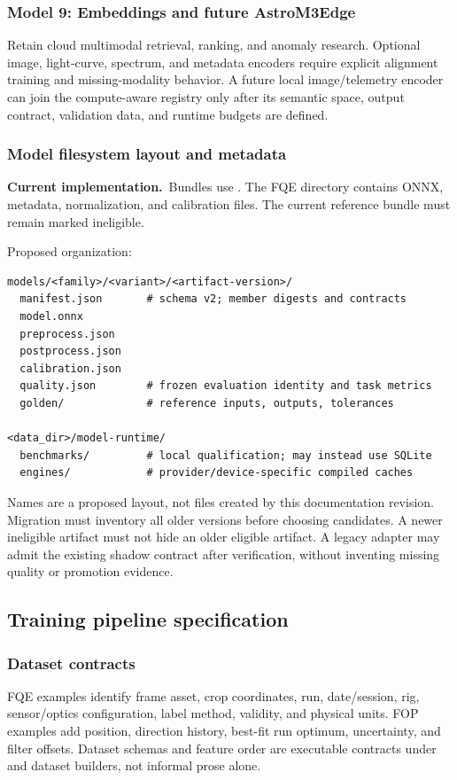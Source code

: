 \documentclass[11pt,a4paper]{article}
\newcommand{\code}[1]{\texttt{\detokenize{#1}}}
\newcommand{\current}{\textbf{Current implementation.}\ }
\begin{document}
\subsubsection{Model 9: Embeddings and future AstroM3Edge}
Retain cloud multimodal retrieval, ranking, and anomaly research. Optional image,
light-curve, spectrum, and metadata encoders require explicit alignment training
and missing-modality behavior. A future local image/telemetry encoder can join
the compute-aware registry only after its semantic space, output contract,
validation data, and runtime budgets are defined.

\subsubsection{Model filesystem layout and metadata}
\current Bundles use \code{models/<model_name>/<version>/}. The FQE directory
contains ONNX, metadata, normalization, and calibration files. The current
reference bundle must remain marked ineligible.

Proposed organization:
\begin{lstlisting}
models/<family>/<variant>/<artifact-version>/
  manifest.json       # schema v2; member digests and contracts
  model.onnx
  preprocess.json
  postprocess.json
  calibration.json
  quality.json        # frozen evaluation identity and task metrics
  golden/             # reference inputs, outputs, tolerances

<data_dir>/model-runtime/
  benchmarks/         # local qualification; may instead use SQLite
  engines/            # provider/device-specific compiled caches
\end{lstlisting}
Names are a proposed layout, not files created by this documentation revision.
Migration must inventory all older versions before choosing candidates. A
newer ineligible artifact must not hide an older eligible artifact. A legacy
adapter may admit the existing shadow contract after verification, without
inventing missing quality or promotion evidence.

\subsection{Training pipeline specification}
\subsubsection{Dataset contracts}
FQE examples identify frame asset, crop coordinates, run, date/session, rig,
sensor/optics configuration, label method, validity, and physical units. FOP
examples add position, direction history, best-fit run optimum, uncertainty,
and filter offsets. Dataset schemas and feature order are executable contracts
under \code{ml/contracts} and dataset builders, not informal prose alone.
\end{document}
